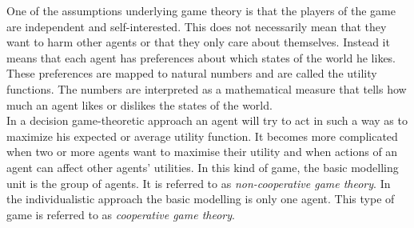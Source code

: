 One of the assumptions underlying game theory is that the players of the game are independent and self-interested. This does not necessarily mean that they want to harm other agents or that they only care about themselves. 
Instead it means that each agent has preferences about which states of the world he likes. These preferences are mapped to natural numbers and are called the utility functions. The numbers are interpreted as a mathematical measure that tells how much an agent likes or dislikes the states of the world. \\
%

In a decision game-theoretic approach an agent will try to act in such a way as to maximize his expected or average utility function. It becomes more complicated when two or more agents want to maximise their utility and when actions of an agent can affect other agents' utilities. In this kind of game, the basic modelling unit is the group of agents. It is referred to as \textit{non-cooperative game theory}. In the individualistic approach the basic modelling is only one agent. This type of game is referred to as \textit{cooperative game theory}. 

 


